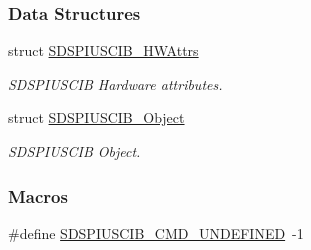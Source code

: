 \subsubsection*{Data Structures}
\begin{DoxyCompactItemize}
\item 
struct \hyperlink{struct_s_d_s_p_i_u_s_c_i_b___h_w_attrs}{S\-D\-S\-P\-I\-U\-S\-C\-I\-B\-\_\-\-H\-W\-Attrs}
\begin{DoxyCompactList}\small\item\em S\-D\-S\-P\-I\-U\-S\-C\-I\-B Hardware attributes. \end{DoxyCompactList}\item 
struct \hyperlink{struct_s_d_s_p_i_u_s_c_i_b___object}{S\-D\-S\-P\-I\-U\-S\-C\-I\-B\-\_\-\-Object}
\begin{DoxyCompactList}\small\item\em S\-D\-S\-P\-I\-U\-S\-C\-I\-B Object. \end{DoxyCompactList}\end{DoxyCompactItemize}
\subsubsection*{Macros}
\begin{DoxyCompactItemize}
\item 
\#define \hyperlink{_s_d_s_p_i_u_s_c_i_b_8h_a0c89e6dde0f1f339741cb50e79055b78}{S\-D\-S\-P\-I\-U\-S\-C\-I\-B\-\_\-\-C\-M\-D\-\_\-\-U\-N\-D\-E\-F\-I\-N\-E\-D}~-\/1
\end{DoxyCompactItemize}
